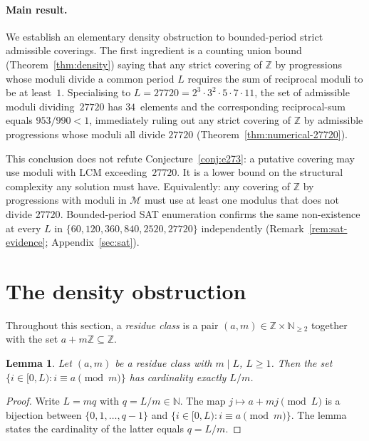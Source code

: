 \documentclass[11pt,a4paper]{article}
\theoremstyle{plain}
\newtheorem{lemma}[theorem]{Lemma}
\theoremstyle{definition}
\theoremstyle{remark}
\begin{document}
\paragraph{Main result.}
We establish an elementary density obstruction to bounded-period
strict admissible coverings. The first ingredient is a counting
union bound (Theorem~\ref{thm:density}) saying that any strict
covering of $\mathbb{Z}$ by progressions whose moduli divide a
common period $L$ requires the sum of reciprocal moduli to be at
least~$1$. Specialising to $L = 27720 = 2^3\cdot 3^2 \cdot 5 \cdot 7
\cdot 11$, the set of admissible moduli dividing~$27720$ has
$34$~elements and the corresponding reciprocal-sum equals
$953/990 < 1$, immediately ruling out any strict covering of
$\mathbb{Z}$ by admissible progressions whose moduli all divide
$27720$ (Theorem~\ref{thm:numerical-27720}).

This conclusion does not refute Conjecture~\ref{conj:e273}: a
putative covering may use moduli with LCM exceeding~$27720$. It is
a lower bound on the structural complexity any solution must have.
Equivalently: any covering of $\mathbb{Z}$ by progressions with
moduli in $\mathcal{M}$ must use at least one modulus that does not
divide $27720$. Bounded-period SAT enumeration confirms the same
non-existence at every $L$ in $\{60, 120, 360, 840, 2520, 27720\}$
independently (Remark~\ref{rem:sat-evidence}; Appendix~\ref{sec:sat}).

\section{The density obstruction}
\label{sec:density}

Throughout this section, a \emph{residue class} is a pair
$(a, m) \in \mathbb{Z} \times \mathbb{N}_{\geq 2}$ together with
the set $a + m\mathbb{Z} \subseteq \mathbb{Z}$.

\begin{lemma}\label{lem:per-class-count}
Let $(a, m)$ be a residue class with $m \mid L$, $L \geq 1$. Then
the set $\{ i \in [0, L) : i \equiv a \pmod{m} \}$ has cardinality
exactly $L / m$.
\end{lemma}
\begin{proof}
Write $L = mq$ with $q = L/m \in \mathbb{N}$. The map $j \mapsto a +
mj \pmod{L}$ is a bijection between $\{0, 1, \ldots, q-1\}$ and
$\{ i \in [0, L) : i \equiv a \pmod m \}$. The lemma states the
cardinality of the latter equals $q = L/m$.
\end{proof}
\end{document}
